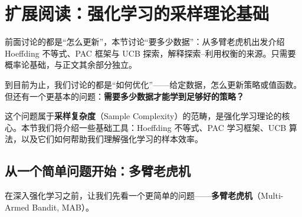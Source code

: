 \section*{扩展阅读：强化学习的采样理论基础}

\begin{tcolorbox}[colback=gray!5, colframe=gray!50, title=本节导读]
前面讨论的都是“怎么更新”，本节讨论“要多少数据”：从多臂老虎机出发介绍 Hoeffding 不等式、PAC 框架与 UCB 探索，解释探索--利用权衡的来源。只需要概率论基础，与正文其余部分独立。
\end{tcolorbox}



到目前为止，我们讨论的都是“如何优化”——给定数据，怎么更新策略或值函数。但还有一个更基本的问题：\textbf{需要多少数据才能学到足够好的策略？}

这个问题属于\textbf{采样复杂度}（Sample Complexity）的范畴，是强化学习理论的核心。本节我们将介绍一些基础工具：Hoeffding 不等式、PAC 学习框架、UCB 算法，以及它们如何帮助我们理解强化学习的样本效率。

\subsection{从一个简单问题开始：多臂老虎机}

在深入强化学习之前，让我们先看一个更简单的问题——\textbf{多臂老虎机}（Multi-Armed Bandit, MAB）。

